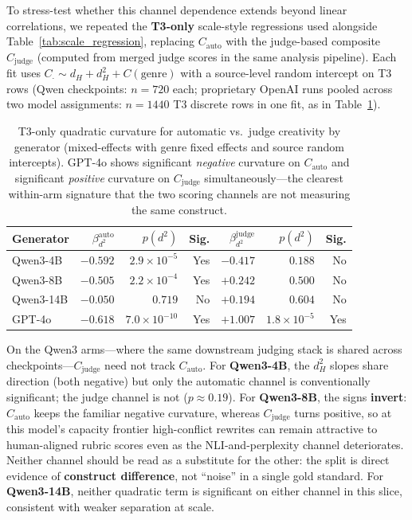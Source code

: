 \documentclass[sigconf,nonacm]{acmart}
\begin{document}
To stress-test whether this channel dependence extends beyond linear correlations, we repeated the \textbf{T3-only} scale-style regressions used alongside Table~\ref{tab:scale_regression}, replacing $C_{\mathrm{auto}}$ with the judge-based composite $C_{\mathrm{judge}}$ (computed from merged judge scores in the same analysis pipeline).
Each fit uses $C_{\cdot} \sim d_H + d_H^2 + C(\mathrm{genre})$ with a source-level random intercept on T3 rows (Qwen checkpoints: $n{=}720$ each; proprietary OpenAI runs pooled across two model assignments: $n{=}1440$ T3 discrete rows in one fit, as in Table~\ref{tab:judge_auto_divergence}).

\begin{table}[t]
\centering
\small
\begin{tabular}{lrrrrrr}
\toprule
Generator & $\beta_{d^2}^{\mathrm{auto}}$ & $p(d^2)$ & Sig. & $\beta_{d^2}^{\mathrm{judge}}$ & $p(d^2)$ & Sig. \\
\midrule
Qwen3-4B  & $-0.592$ & $2.9{\times}10^{-5}$ & Yes & $-0.417$ & $0.188$ & No \\
Qwen3-8B  & $-0.505$ & $2.2{\times}10^{-4}$ & Yes & $+0.242$ & $0.500$ & No \\
Qwen3-14B & $-0.050$ & $0.719$               & No  & $+0.194$ & $0.604$ & No \\
GPT-4o    & $-0.618$ & $7.0{\times}10^{-10}$ & Yes & $+1.007$ & $1.8{\times}10^{-5}$ & Yes \\
\bottomrule
\end{tabular}
\caption{T3-only quadratic curvature for automatic vs.\ judge creativity by generator (mixed-effects with genre fixed effects and source random intercepts). GPT-4o shows significant \emph{negative} curvature on $C_{\mathrm{auto}}$ and significant \emph{positive} curvature on $C_{\mathrm{judge}}$ simultaneously---the clearest within-arm signature that the two scoring channels are not measuring the same construct.}
\label{tab:judge_auto_divergence}
\end{table}

On the Qwen3 arms---where the same downstream judging stack is shared across checkpoints---$C_{\mathrm{judge}}$ need not track $C_{\mathrm{auto}}$.
For \textbf{Qwen3-4B}, the $d_H^2$ slopes share direction (both negative) but only the automatic channel is conventionally significant; the judge channel is not ($p{\approx}0.19$).
For \textbf{Qwen3-8B}, the signs \textbf{invert}: $C_{\mathrm{auto}}$ keeps the familiar negative curvature, whereas $C_{\mathrm{judge}}$ turns positive, so at this model's capacity frontier high-conflict rewrites can remain attractive to human-aligned rubric scores even as the NLI-and-perplexity channel deteriorates.
Neither channel should be read as a substitute for the other: the split is direct evidence of \textbf{construct difference}, not ``noise'' in a single gold standard.
For \textbf{Qwen3-14B}, neither quadratic term is significant on either channel in this slice, consistent with weaker separation at scale.
\end{document}
